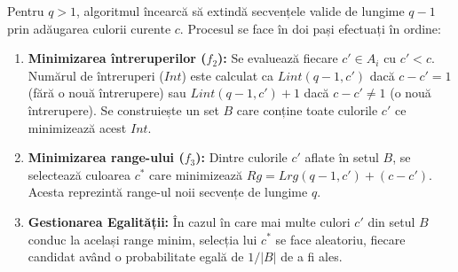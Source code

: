 Pentru $q > 1$, algoritmul încearcă să extindă secvențele valide de lungime $q-1$ prin adăugarea culorii curente $c$. Procesul se face în doi pași efectuați în ordine:
\begin{enumerate}
    \item \textbf{Minimizarea întreruperilor ($f_2$):} Se evaluează fiecare $c' \in A_i$ cu $c' < c$. Numărul de întreruperi ($Int$) este calculat ca $Lint(q-1, c')$ dacă $c - c' = 1$ (fără o nouă întrerupere) sau $Lint(q-1, c') + 1$ dacă $c - c' \neq 1$ (o nouă întrerupere). Se construiește un set $B$ care conține toate culorile $c'$ ce minimizează acest $Int$.
    \item \textbf{Minimizarea range-ului ($f_3$):} Dintre culorile $c'$ aflate în setul $B$, se selectează culoarea $c^*$ care minimizează $Rg = Lrg(q-1, c') + (c - c')$. Acesta reprezintă range-ul noii secvențe de lungime $q$.
    \item \textbf{Gestionarea Egalității:} În cazul în care mai multe culori $c'$ din setul $B$ conduc la același range minim, selecția lui $c^*$ se face aleatoriu, fiecare candidat având o probabilitate egală de $1/|B|$ de a fi ales.
\end{enumerate}
    
